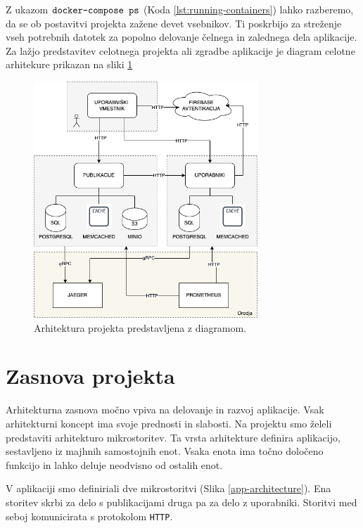 \documentclass[a4paper, 12pt]{book}
\begin{document}
Z ukazom $\verb=docker-compose ps=$ (Koda \ref{lst:running-containers}) lahko razberemo, da se ob postavitvi projekta zažene devet vsebnikov. Ti poskrbijo za streženje vseh potrebnih datotek za popolno delovanje čelnega in zalednega dela aplikacije. Za lažjo predstavitev celotnega projekta ali zgradbe aplikacije je diagram celotne arhitekure prikazan na sliki \ref{final-arch}


\begin{figure}[h]
\begin{center}
\includegraphics[width=0.75\textwidth]{slike/arch-done.png}
\end{center}
\caption{ Arhitektura projekta predstavljena z diagramom. }
\label{final-arch}
\end{figure}



\section{Zasnova projekta}
Arhitekturna zasnova močno vpiva na delovanje in razvoj aplikacije. Vsak arhitekturni koncept ima svoje prednosti in slabosti. Na projektu smo želeli predstaviti arhitekturo mikrostoritev. Ta vrsta arhitekture definira aplikacijo, sestavljeno iz majhnih samostojnih enot. Vsaka enota ima točno določeno funkcijo in lahko deluje neodvisno od ostalih enot.

V aplikaciji smo definiriali dve mikrostoritvi (Slika \ref{app-architecture}). Ena storitev skrbi za delo s publikacijami druga pa za delo z uporabniki. Storitvi med seboj komunicirata s protokolom \verb=HTTP=.
\end{document}
